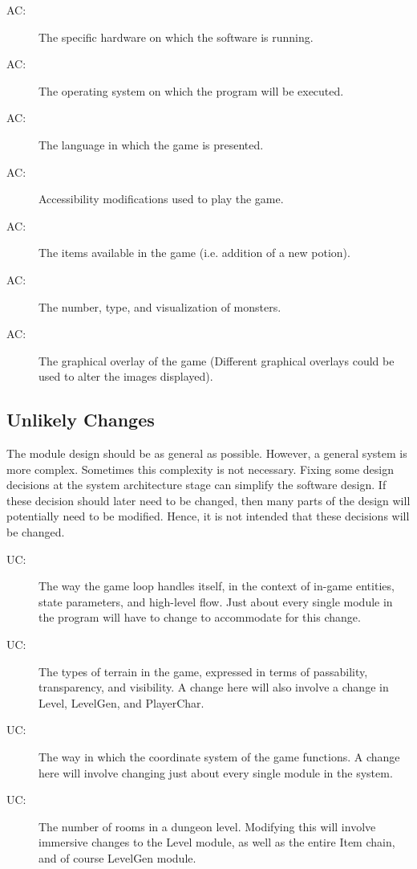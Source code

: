 \documentclass[12pt, titlepage]{article}
\newcounter{acnum}
\newcommand{\actheacnum}{AC\theacnum}
\newcounter{ucnum}
\newcommand{\uctheucnum}{UC\theucnum}
\begin{document}
		\bigskip\begin{description}
			\item[ \actheacnum \label{acHardware}:] The specific hardware on which the software is running.
			\item[ \actheacnum \label{acOs}:] The operating system on which the program will be executed.
			\item[ \actheacnum \label{acLanguage}:] The language in which the game is presented.
			\item[ \actheacnum \label{acAccessibility}:] Accessibility modifications used to play the game.
			\item[ \actheacnum \label{acItems}:] The items available in the game (i.e. addition of a new potion).
			\item[ \actheacnum \label{acMonsters}:] The number, type, and visualization of monsters.
			\item[ \actheacnum \label{acVisuals}:] The graphical overlay of the game (Different graphical overlays could be used to alter the images displayed).
		\end{description}

	\subsection{Unlikely Changes} \label{SecUchange}

		The module design should be as general as possible. However, a general system is more complex. Sometimes this complexity is not necessary. Fixing some design decisions at the system architecture stage can simplify the software design. If these decision should later need to be changed, then many parts of the design	will potentially need to be modified. Hence, it is not intended that these decisions will be changed.

		\bigskip\begin{description}
			\item[ \uctheucnum \label{ucMasterCtrl}:] The way the game loop handles itself, in the context of in-game entities, state parameters, and high-level flow. Just about every single module in the program will have to change to accommodate for this change.
			\item[ \uctheucnum \label{ucTerrain}:] The types of terrain in the game, expressed in terms of passability, transparency, and visibility. A change here will also involve a change in Level, LevelGen, and PlayerChar.
			\item[ \uctheucnum \label{ucCoord}:] The way in which the coordinate system of the game functions. A change here will involve changing just about every single module in the system.
			\item[ \uctheucnum \label{ucRooms}:] The number of rooms in a dungeon level. Modifying this will involve immersive changes to the Level module, as well as the entire Item chain, and of course LevelGen module.
		\end{description}
\end{document}
